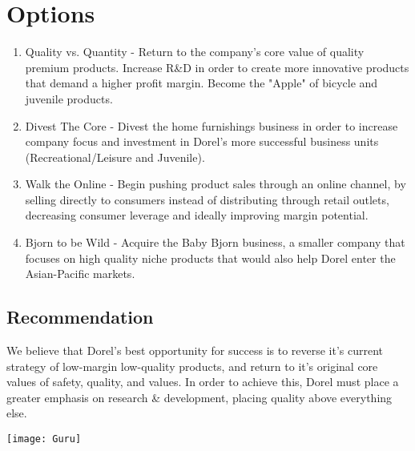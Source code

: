 \pagebreak
\chapter*{Options}


\begin{enumerate}
  \item Quality vs. Quantity - Return to the company's core value of quality premium products.  Increase R\&D in order to create more innovative products that demand a higher profit margin.  Become the "Apple" of bicycle and juvenile products.
  \item Divest The Core - Divest the home furnishings business in order to increase company focus and investment in Dorel's more successful business units (Recreational/Leisure and Juvenile).
  \item Walk the Online - Begin pushing product sales through an online channel, by selling directly to consumers instead of distributing through retail outlets, decreasing consumer leverage and ideally improving margin potential.
  \item Bjorn to be Wild - Acquire the Baby Bjorn business, a smaller company that focuses on high quality niche products that would also help Dorel enter the Asian-Pacific markets.
\end{enumerate}

\section{Recommendation}
We believe that Dorel's best opportunity for success is to reverse it's current strategy of low-margin low-quality products, and return to it's original core values of safety, quality, and values.  In order to achieve this, Dorel must place a greater emphasis on research \& development, placing quality above everything else.  
\\[2\baselineskip]
\centerline{\texttt{[image: Guru]}}


\endgroup			

\vfill

